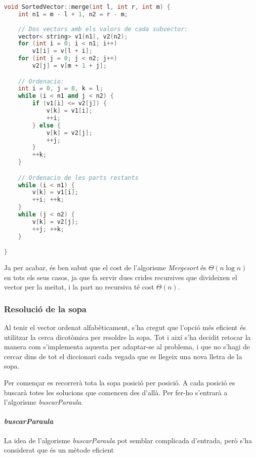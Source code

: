 \documentclass[titlepage]{article}
\begin{document}
\begin{lstlisting}[language=C++]
void SortedVector::merge(int l, int r, int m) {
    int n1 = m - l + 1, n2 = r - m;
    
    // Dos vectors amb els valors de cada subvector:
    vector< string> v1(n1), v2(n2);
    for (int i = 0; i < n1; i++)
        v1[i] = v[l + i];
    for (int j = 0; j < n2; j++)
        v2[j] = v[m + 1 + j];

    // Ordenacio:
    int i = 0, j = 0, k = l;
    while (i < n1 and j < n2) {
        if (v1[i] <= v2[j]) {
            v[k] = v1[i];
            ++i;
        } else {
            v[k] = v2[j];
            ++j;
        }
        ++k;
    }

    // Ordenacio de les parts restants
    while (i < n1) {
        v[k] = v1[i];
        ++i; ++k;
    }
    while (j < n2) {
        v[k] = v2[j];
        ++j; ++k;
    }

}
\end{lstlisting}

Ja per acabar, és ben sabut que el cost de l'algorisme \textit{Mergesort} és $\Theta(n\log{}n)$ en tots els seus casos, ja que fa servir dues crides recursives que divideixen el vector per la meitat, i la part no recursiva té cost $\Theta(n)$.


\subsubsection{Resolució de la sopa}
Al tenir el vector ordenat alfabèticament, s'ha cregut que l'opció més eficient és utilitzar la cerca dicotòmica per resoldre la sopa. Tot i així s'ha decidit retocar la manera com s'implementa aquesta per adaptar-se al problema, i que no s'hagi de cercar dins de tot el diccionari cada vegada que es llegeix una nova lletra de la sopa. \newline\par
Per començar es recorrerà tota la sopa posició per posició. A cada posició es buscarà totes les solucions que comencen des d'allà. Per fer-ho s'entrarà a l'algorisme \textit{buscarParaula}.
\paragraph{\textit{buscarParaula}}
La idea de l'algorisme \textit{buscarParaula} pot semblar complicada d'entrada, però s'ha considerat que és un mètode eficient
\end{document}
